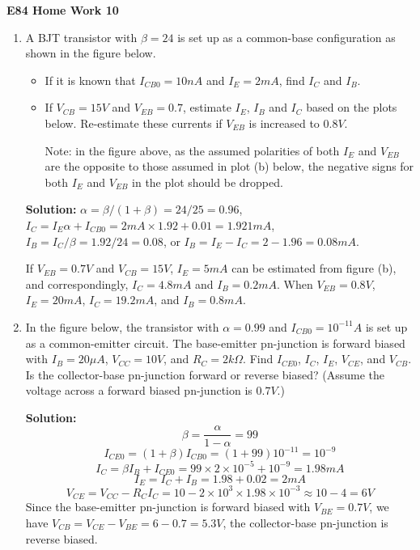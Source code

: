 \usepackage{html}

\begin{center}
{\Large \bf  E84 Home Work 10}
\end{center}

\begin{enumerate}

\item A BJT transistor with $\beta=24$ is set up as a common-base 
configuration as shown in the figure below. 

\begin{itemize} 
\item If it is known that $I_{CB0}=10 nA$ and $I_E=2 mA$, find $I_C$ 
  and $I_B$.
\item If $V_{CB}=15V$ and $V_{EB}=0.7$, estimate $I_E$, $I_B$ and $I_C$ 
  based on the plots below. Re-estimate these currents if $V_{EB}$ is 
  increased to $0.8V$.

  Note: in the figure above, as the assumed polarities of both $I_E$ and 
  $V_{EB}$ are the opposite to those assumed in plot (b) below, the negative
  signs for both $I_E$ and $V_{EB}$ in the plot should be dropped.

\end{itemize}


{\bf Solution:} $\alpha=\beta/(1+\beta)=24/25=0.96$, 
$I_C=I_E \alpha + I_{CB0}=2 mA \times 1.92+0.01=1.921 mA$,
$I_B=I_C/\beta=1.92/24=0.08$, or $I_B=I_E-I_C=2-1.96=0.08 mA$.

If $V_{EB}=0.7 V$ and $V_{CB}=15V$, $I_E=5 mA$ can be estimated from 
figure (b), and correspondingly, $I_C=4.8 mA$ and $I_B=0.2 mA$. When 
$V_{EB}=0.8 V$, $I_E=20 mA$, $I_C=19.2 mA$, and $I_B=0.8 mA$.

\item In the figure below, the transistor with $\alpha=0.99$ and
  $I_{CB0}=10^{-11} A$ is set up as a common-emitter circuit. The
  base-emitter pn-junction is forward biased with $I_B=20 \mu A$, 
  $V_{CC}=10V$, and $R_C=2k\Omega$. Find $I_{CE0}$, $I_C$, $I_E$, 
  $V_{CE}$, and $V_{CB}$. Is the collector-base pn-junction forward
  or reverse biased? (Assume the voltage across a forward biased 
  pn-junction is $0.7 V$.)
  

{\bf Solution:} 
\[ \beta=\frac{\alpha}{1-\alpha}=99 \]
\[ I_{CE0}=(1+\beta) I_{CB0}=(1+99) 10^{-11}=10^{-9} \]
\[ I_C=\beta I_B+I_{CE0}=99 \times 2 \times 10^{-5} + 10^{-9}=1.98 mA \]
\[ I_E=I_C+I_B=1.98+0.02=2 mA \]
\[ V_{CE}=V_{CC}-R_C I_C=10-2 \times 10^3 \times 1.98 \times 10^{-3}
   \approx 10-4=6 V \]
Since the base-emitter pn-junction is forward biased with $V_{BE}=0.7V$,
we have $V_{CB}=V_{CE}-V_{BE}=6-0.7=5.3 V$, the collector-base pn-junction
is reverse biased.


\end{enumerate}
